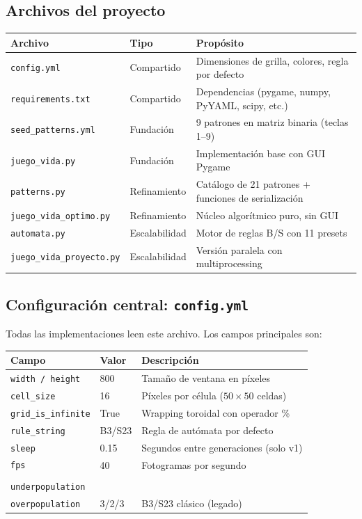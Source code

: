 \documentclass[12pt,a4paper]{article}
\begin{document}
\subsection{Archivos del proyecto}

\begin{table}[h]
\centering
\begin{tabular}{llp{6cm}}
\toprule
\textbf{Archivo} & \textbf{Tipo} & \textbf{Propósito} \\
\midrule
\texttt{config.yml}       & Compartido & Dimensiones de grilla, colores, regla por defecto \\
\texttt{requirements.txt} & Compartido & Dependencias (pygame, numpy, PyYAML, scipy, etc.) \\
\texttt{seed\_patterns.yml} & Fundación & 9 patrones en matriz binaria (teclas 1--9) \\
\texttt{juego\_vida.py}     & Fundación & Implementación base con GUI Pygame \\
\texttt{patterns.py}        & Refinamiento & Catálogo de 21 patrones + funciones de serialización \\
\texttt{juego\_vida\_optimo.py} & Refinamiento & Núcleo algorítmico puro, sin GUI \\
\texttt{automata.py}        & Escalabilidad & Motor de reglas B/S con 11 presets \\
\texttt{juego\_vida\_proyecto.py} & Escalabilidad & Versión paralela con multiprocessing \\
\bottomrule
\end{tabular}
\end{table}

\subsection{Configuración central: \texttt{config.yml}}

Todas las implementaciones leen este archivo. Los campos principales son:

\begin{table}[h]
\centering
\footnotesize
\begin{tabular}{p{4.5cm}p{2cm}p{7cm}}
\toprule
\textbf{Campo} & \textbf{Valor} & \textbf{Descripción} \\
\midrule
\texttt{width / height} & 800 & Tamaño de ventana en píxeles \\
\texttt{cell\_size}      & 16  & Píxeles por célula ($50\times50$ celdas) \\
\texttt{grid\_is\_infinite} & True & Wrapping toroidal con operador \% \\
\texttt{rule\_string}    & B3/S23 & Regla de autómata por defecto \\
\texttt{sleep}           & 0.15 & Segundos entre generaciones (solo v1) \\
\texttt{fps}             & 40   & Fotogramas por segundo \\
\makecell[l]{\texttt{reproduction}\\ \texttt{underpopulation}\\ \texttt{overpopulation}} & 3/2/3 & B3/S23 clásico (legado) \\
\bottomrule
\end{tabular}
\end{table}
\end{document}
